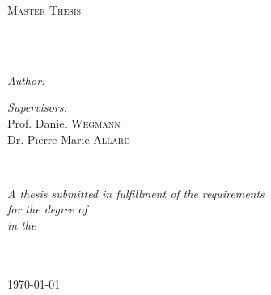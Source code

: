 \documentclass[
11pt, %
english, %
singlespacing, %
headsepline, %
chapterinoneline, %
]{MastersDoctoralThesis} %
\author{Marco \textsc{Visani}} %
\begin{document}
\frontmatter %

\pagestyle{plain} %


\begin{titlepage}
\begin{center}

\vspace*{.06\textheight}
{\scshape\LARGE \univname\par}\vspace{1.5cm} %
\textsc{\Large Master Thesis}\\[0.5cm] %

\HRule \\[0.4cm] %
{\huge \bfseries \ttitle\par}\vspace{0.4cm} %
\HRule \\[1.5cm] %
 
\begin{minipage}[t]{0.4\textwidth}
\begin{flushleft} \large
\emph{Author:}\\
\href{mailto:contact@vismarco.ch}{\authorname} %
\end{flushleft}
\end{minipage}
\begin{minipage}[t]{0.4\textwidth}
\begin{flushright} \large
\emph{Supervisors:} \\
\href{mailto:daniel.wegmann@unifr.ch}{Prof. Daniel \textsc{Wegmann}} \\
\href{mailto:pierre-marie.allard@unifr.ch}{Dr. Pierre-Marie \textsc{Allard}}%
\end{flushright}
\end{minipage}\\[3cm]
 
\vfill

\large \textit{A thesis submitted in fulfillment of the requirements \\ for the degree of \degreename}\\[0.3cm] %
\textit{in the}\\[0.4cm]
\groupname\\\deptname\\[2cm] %
 
\vfill

{\large \today}\\[4cm] %
 
\vfill
\end{center}
\end{titlepage}
\end{document}
